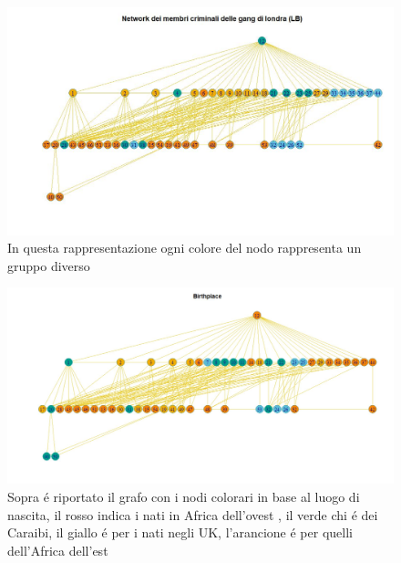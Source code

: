 \documentclass[11pt,a4paper]{report}
\begin{document}
\begin{figure}[H]
	\centering
	\includegraphics[scale=0.75]{last}
	\caption{In questa rappresentazione ogni colore del nodo rappresenta un gruppo diverso}
\end{figure}
\begin{figure}[H]
	\centering
	\includegraphics[scale =0.5]{BirthPlace}
	\caption{Sopra \'e riportato il grafo con i nodi colorari in base al luogo di nascita, il rosso indica i nati in Africa dell'ovest , il verde chi \'e dei Caraibi, il giallo \'e per i nati negli UK, l'arancione \'e per quelli dell'Africa dell'est}
	
	
\end{figure}
\end{document}
